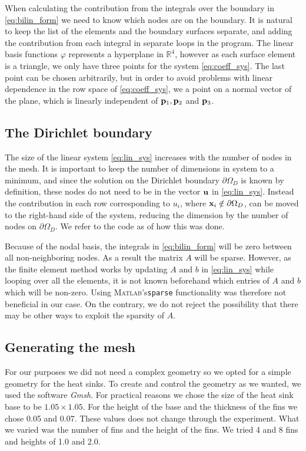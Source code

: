 When calculating the contribution from the integrals over the boundary in \eqref{eq:bilin_form} we need to know which nodes are on the boundary. It is natural to keep the list of the elements and the boundary surfaces separate, and adding the contribution from each integral in separate loops in the program. The linear basis functions $\varphi$ represents a hyperplane in $\mathbb{R}^4$, however as each surface element is a triangle, we only have three points for the system \eqref{eq:coeff_sys}. The last point can be chosen arbitrarily, but in order to avoid problems with linear dependence in the row space of \eqref{eq:coeff_sys}, we a point on a normal vector of the plane, which is linearly independent of $\vb{p}_1,\vb{p}_2$ and $\vb{p}_3$.

\subsection{The Dirichlet boundary}
 The size of the linear system \eqref{eq:lin_sys} increases with the number of nodes in the mesh. It is important to keep the number of dimensions in system to a minimum, and since the solution on the Dirichlet boundary $\partial\Omega_D$ is known by definition, these nodes do not need to be in the vector $\vb{u}$ in \eqref{eq:lin_sys}. Instead the contribution in each row corresponding to $u_i$, where $\vb{x}_i \notin \partial\Omega_D$, can be moved to the right-hand side of the system, reducing the dimension by the number of nodes on $\partial\Omega_D$. We refer to the code as of how this was done.

 Because of the nodal basis, the integrals in \eqref{eq:bilin_form} will be zero between all non-neighboring nodes. As a result the matrix $A$ will be sparse. However, as the finite element method works by updating $A$ and $b$ in \eqref{eq:lin_sys} while looping over all the elements, it is not known beforehand which entries of $A$ and $b$ which will be non-zero. Using \textsc{Matlab}'s\xspace \texttt{sparse} functionality was therefore not beneficial in our case. On the contrary, we do not reject the possibility that there may be other ways to exploit the sparsity of $A$.


\subsection{Generating the mesh}
 For our purposes we did not need a complex geometry so we opted for a simple geometry for the heat sinks. To create and control the geometry as we wanted, we used the software \textit{Gmsh}. For practical reasons we chose the size of the heat sink base to be $1.05\times1.05$. For the height of the base and the thickness of the fins we chose 0.05 and 0.07. These values does not change through the experiment. What we varied was the number of fins and the height of the fins. We tried 4 and 8 fins and heights of 1.0 and 2.0.

